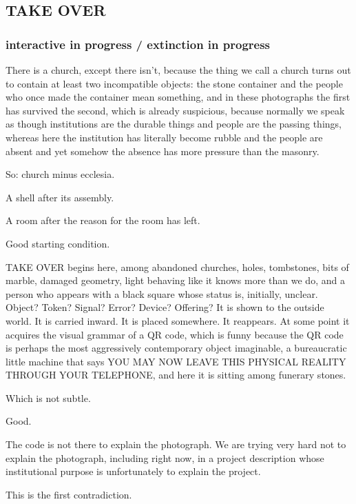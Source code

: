 \subsection{TAKE OVER}\label{take-over}

\subsubsection{interactive in progress / extinction in
progress}\label{interactive-in-progress-extinction-in-progress}

There is a church, except there isn't, because the thing we call a
church turns out to contain at least two incompatible objects: the stone
container and the people who once made the container mean something, and
in these photographs the first has survived the second, which is already
suspicious, because normally we speak as though institutions are the
durable things and people are the passing things, whereas here the
institution has literally become rubble and the people are absent and
yet somehow the absence has more pressure than the masonry.

So: church minus ecclesia.

A shell after its assembly.

A room after the reason for the room has left.

Good starting condition.

TAKE OVER begins here, among abandoned churches, holes, tombstones, bits
of marble, damaged geometry, light behaving like it knows more than we
do, and a person who appears with a black square whose status is,
initially, unclear. Object? Token? Signal? Error? Device? Offering? It
is shown to the outside world. It is carried inward. It is placed
somewhere. It reappears. At some point it acquires the visual grammar of
a QR code, which is funny because the QR code is perhaps the most
aggressively contemporary object imaginable, a bureaucratic little
machine that says YOU MAY NOW LEAVE THIS PHYSICAL REALITY THROUGH YOUR
TELEPHONE, and here it is sitting among funerary stones.

Which is not subtle.

Good.

The code is not there to explain the photograph. We are trying very hard
not to explain the photograph, including right now, in a project
description whose institutional purpose is unfortunately to explain the
project.

This is the first contradiction.

